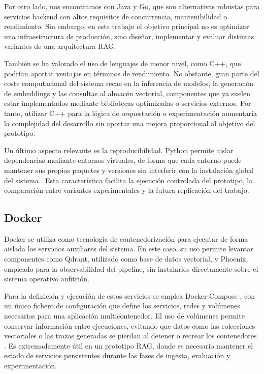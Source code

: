 Por otro lado, nos encontramos con Java y Go, que son alternativas robustas para servicios backend con altos requisitos de concurrencia, mantenibilidad o rendimiento. 
Sin embargo, en este trabajo el objetivo principal no es optimizar una infraestructura de producción, sino diseñar, implementar y evaluar distintas variantes de una arquitectura RAG. 

También se ha valorado el uso de lenguajes de menor nivel, como C++, que podrían aportar ventajas en términos de rendimiento. 
No obstante, gran parte del coste computacional del sistema recae en la inferencia de modelos, la generación de embeddings y las consultas al almacén vectorial, componentes que ya suelen estar implementados mediante bibliotecas optimizadas o servicios externos.
Por tanto, utilizar C++ para la lógica de orquestación o experimentación aumentaría la complejidad del desarrollo sin aportar una mejora proporcional al objetivo del prototipo.

Un último aspecto relevante es la reproducibilidad. Python permite aislar dependencias mediante entornos virtuales, de forma que cada entorno puede mantener sus propios paquetes y versiones sin interferir con la instalación global del sistema \cite{pep405}. 
Esta característica facilita la ejecución controlada del prototipo, la comparación entre variantes experimentales y la futura replicación del trabajo.

\subsection{Docker}\label{subsec:docker}

Docker se utiliza como tecnología de contenedorización para ejecutar de forma aislada los servicios auxiliares del sistema. 
En este caso, su uso permite levantar componentes como Qdrant, utilizado como base de datos vectorial, y Phoenix, empleado para la observabilidad del pipeline, sin instalarlos directamente sobre el sistema operativo anfitrión.

Para la definición y ejecución de estos servicios se emplea Docker Compose \cite{dockerCompose}, con un único fichero de configuración que define los servicios, redes y volúmenes necesarios para una aplicación multicontenedor. 
El uso de volúmenes permite conservar información entre ejecuciones, evitando que datos como las colecciones vectoriales o las trazas generadas se pierdan al detener o recrear los contenedores \cite{dockerVolumes}. 
Es extremadamente útil en un prototipo RAG, donde es necesario mantener el estado de servicios persistentes durante las fases de ingesta, evaluación y experimentación.

